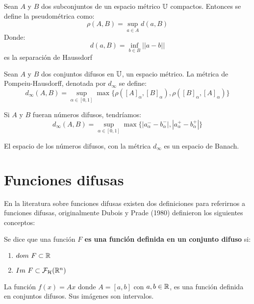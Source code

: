   \begin{definicion}[Pseudométrica]
    Sean $A$ y $B$ dos subconjuntos de un espacio métrico $\mathbb U$ compactos. Entonces se define la pseudométrica como:
    \[
    \rho(A, B) = \sup\limits_{a \in A} d(a, B)
    \]
    Donde:
    \[
    d(a, B) = \inf\limits_{b \in B} ||a-b||
    \]
    es la separación de Haussdorf
  \end{definicion}

  \begin{definicion}
    \label{def:metricadifusa}
    Sean $A$ y $B$ dos conjuntos difusos en $\mathbb U$, un espacio métrico. La métrica de Pompeiu-Hausdorff, denotada por $d_\infty$ se define:
    \[
    d_\infty(A, B) = \sup\limits_{\alpha \in [0, 1]} \max\{\rho([A]_\alpha, [B]_\alpha), \rho([B]_\alpha,  [A]_\alpha)\}
    \]
    
    Si $A$ y $B$ fueran números difusos, tendríamos:
    \[
    d_\infty(A, B) = \sup\limits_{\alpha \in [0, 1]} \max\{|a_\alpha^- - b_\alpha^-|, |a_\alpha^+ - b_\alpha^+|\}
    \]
  \end{definicion}

  \begin{teorema}
    \label{teorema:banach}
    El espacio de los números difusos, con la métrica $d_\infty$ es un espacio de Banach.
  \end{teorema}

  \section{Funciones difusas}
  En la literatura sobre funciones difusas existen dos definiciones para referirnos a funciones difusas, originalmente Dubois y Prade (1980) definieron los siguientes conceptos:

  \begin{definicion}
    \label{def:fizzusetvaluedfunc} Se dice que una función \textbf{$F$ es una función definida en un conjunto difuso} si:
    \begin{enumerate}
    \item $dom ~ F \subset \mathbb R$
    \item $Im ~ F \subset \mathcal{F}_\mathcal{H}(\mathbb R^n)$
    \end{enumerate}
  \end{definicion}

  \begin{ejemplo}
    La función $f(x) = A x$ donde $A=[a, b]$ con $a, b \in \mathbb R$, es una función definida en conjuntos difusos. Sus imágenes son intervalos.
  \end{ejemplo}

